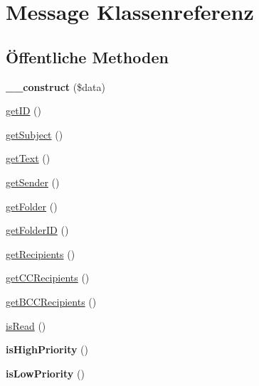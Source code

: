 \hypertarget{class_message}{}\section{Message Klassenreferenz}
\label{class_message}
\subsection*{Öffentliche Methoden}
\begin{DoxyCompactItemize}
\item 
\mbox{\label{class_message_ac82fe989d167c6d49d62e58813186a49}} 
{\bfseries \+\_\+\+\_\+construct} (\$data)
\item 
\mbox{\hyperlink{class_message_a07429231dde016151f678c032841f4c9}{get\+ID}} ()
\item 
\mbox{\hyperlink{class_message_a8ed9678719cd091d87f5bb12e48183f5}{get\+Subject}} ()
\item 
\mbox{\hyperlink{class_message_a49ae811f5b2ea3c6ada0c46696672964}{get\+Text}} ()
\item 
\mbox{\hyperlink{class_message_a267e86c68663783cb70cf5f7b2ff9e72}{get\+Sender}} ()
\item 
\mbox{\hyperlink{class_message_a82121e53141914ccf19a03e8db408c09}{get\+Folder}} ()
\item 
\mbox{\hyperlink{class_message_af11d1ffcd82000fd7d45a779f06e6e8d}{get\+Folder\+ID}} ()
\item 
\mbox{\hyperlink{class_message_aeb4bf1e1791ffcd1f6107211e6fa2602}{get\+Recipients}} ()
\item 
\mbox{\hyperlink{class_message_acc65cd5970cbd169390f3b69bdaf6792}{get\+C\+C\+Recipients}} ()
\item 
\mbox{\hyperlink{class_message_a4f4c35c9066e6808a41f2d3058605d8f}{get\+B\+C\+C\+Recipients}} ()
\item 
\mbox{\hyperlink{class_message_af1525e51e027044ea8694a9ab51048b2}{is\+Read}} ()
\item 
\mbox{\label{class_message_a4569589b9a44dcad315c55c1d1e46182}} 
{\bfseries is\+High\+Priority} ()
\item 
\mbox{\label{class_message_a35f3395a8cb9e9d8d20563a2110f8fe5}} 
{\bfseries is\+Low\+Priority} ()
\item 
\mbox{\label{class_message_a9f0dab9eeaad4d25cc3db76b7857a0c2}} 

\end{DoxyCompactItemize}
